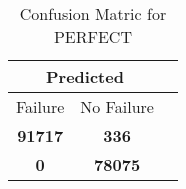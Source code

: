 \begin{table}[] 
\label{Table: Prediction Accuracy-DMDPERFECTOnlySunEKF-combinationReflection-Reflection} 
\caption{Confusion Matric for PERFECT} 
\centering 
\begin{tabular} 
 {@{}ccc@{}} 
\toprule 
\multicolumn{2}{c}{\textbf{Predicted}}
 \\ \midrule 
\multicolumn{1}{|c|}{Failure} & 
\multicolumn{1}{c|}{No Failure}
 \\ \midrule 
\multicolumn{1}{|c|}{\color{green}\textbf{91717}} & 
\multicolumn{1}{c|}{\color{red}\textbf{336}}
 \\ \midrule 
\multicolumn{1}{|c|}{\color{red}\textbf{0}} & 
\multicolumn{1}{c|}{\color{green}\textbf{78075}}
 \\ \bottomrule 
\end{tabular} 
\end{table} 

